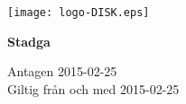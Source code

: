 \begin{titlepage}
\begin{center}
\texttt{[image: logo-DISK.eps]}
\vfill

\fontsize{50}{60}\selectfont \bfseries Stadga

\vfill

\normalsize Antagen 2015-02-25\\Giltig från och med 2015-02-25
\end{center}
\end{titlepage}
